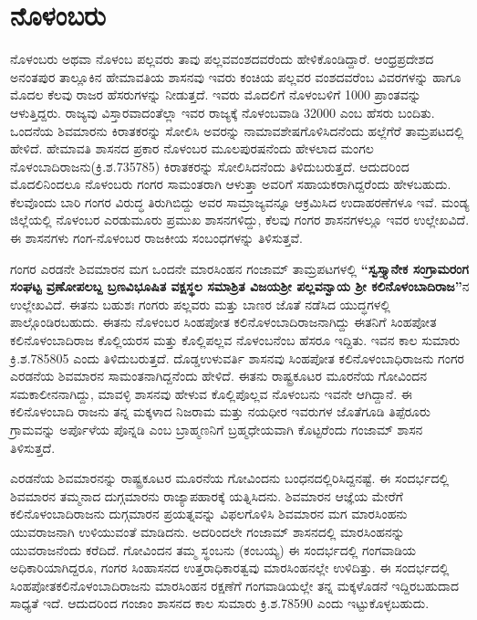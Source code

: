 \section*{ನೊಳಂಬರು}

ನೊಳಂಬರು ಅಥವಾ ನೊಳಂಬ ಪಲ್ಲವರು ತಾವು ಪಲ್ಲವವಂಶದವರೆಂದು ಹೇಳಿಕೊಂಡಿದ್ದಾರೆ. ಆಂಧ್ರಪ್ರದೇಶದ ಅನಂತಪುರ ತಾಲ್ಲೂಕಿನ ಹೇಮಾವತಿಯ ಶಾಸನವು ಇವರು ಕಂಚಿಯ ಪಲ್ಲವರ ವಂಶದವರೆಂಬ ವಿವರಗಳನ್ನು ಹಾಗೂ ಮೊದಲ ಕೆಲವು ರಾಜರ ಹೆಸರುಗಳನ್ನು ನೀಡುತ್ತದೆ. ಇವರು ಮೊದಲಿಗೆ ನೊಳಂಬಳಿಗೆ 1000 ಪ್ರಾಂತವನ್ನು ಆಳುತ್ತಿದ್ದರು. ರಾಜ್ಯವು ವಿಸ್ತಾರವಾದಂತೆಲ್ಲಾ ಇವರ ರಾಜ್ಯಕ್ಕೆ ನೊಳಂಬವಾಡಿ 32000 ಎಂಬ ಹೆಸರು ಬಂದಿತು. ಒಂದನೆಯ ಶಿವಮಾರನು ಕಿರಾತಕರನ್ನು ಸೋಲಿಸಿ ಅವರನ್ನು ನಾಮಾವಶೇಷಗೊಳಿಸಿದನೆಂದು ಹಲ್ಲೆಗೆರೆ ತಾಮ್ರಪಟದಲ್ಲಿ ಹೇಳಿದೆ. ಹೇಮಾವತಿ ಶಾಸನದ ಪ್ರಕಾರ ನೊಳಂಬರ ಮೂಲಪುರಷನೆಂದು ಹೇಳಲಾದ ಮಂಗಲ ನೊಳಂಬಾದಿರಾಜನು(ಕ್ರಿ.ಶ.735\enginline{-}785) ಕಿರಾತಕರನ್ನು ಸೋಲಿಸಿದನೆಂದು ತಿಳಿದುಬರುತ್ತದೆ. ಆದುದರಿಂದ ಮೊದಲಿನಿಂದಲೂ ನೊಳಂಬರು ಗಂಗರ ಸಾಮಂತರಾಗಿ ಆಳುತ್ತಾ ಅವರಿಗೆ ಸಹಾಯಕರಾಗಿದ್ದರೆಂದು ಹೇಳಬಹುದು. ಕೆಲವೊಂದು ಬಾರಿ ಗಂಗರ ವಿರುದ್ಧ ತಿರುಗಿಬಿದ್ದು ಅವರ ಸಾಮ್ರಾಜ್ಯವನ್ನೂ ಆಕ್ರಮಿಸಿದ ಉದಾಹರಣೆಗಳೂ ಇವೆ. ಮಂಡ್ಯ ಜಿಲ್ಲೆಯಲ್ಲಿ ನೊಳಂಬರ ಎರಡುಮೂರು ಪ್ರಮುಖ ಶಾಸನಗಳಿದ್ದು, ಕೆಲವು ಗಂಗರ ಶಾಸನಗಳಲ್ಲೂ ಇವರ ಉಲ್ಲೇಖವಿದೆ. ಈ ಶಾಸನಗಳು ಗಂಗ-ನೊಳಂಬರ ರಾಜಕೀಯ ಸಂಬಂಧಗಳನ್ನು ತಿಳಿಸುತ್ತವೆ.

ಗಂಗರ ಎರಡನೇ ಶಿವಮಾರನ ಮಗ ಒಂದನೇ ಮಾರಸಿಂಹನ ಗಂಜಾಮ್ ತಾಮ್ರಪಟಗಳಲ್ಲಿ \textbf{“ಸ್ವಸ್ತ್ಯಾನೇಕ ಸಂಗ್ರಾಮರಂಗ ಸಂಘಟ್ಟ ವ್ರಣೋಪಲಬ್ದ ಬ್ರಣವಿಭೂಷಿತ ವಕ್ಷಸ್ಥಲ ಸಮಾಶ್ರಿತ ವಿಜಯಶ‍್ರೀ ಪಲ್ಲವನ್ವಾಯ ಶ‍್ರೀ ಕಲಿನೊಳಂಬಾದಿರಾಜ”}ನ ಉಲ್ಲೇಖವಿದೆ. ಈತನು ಬಹುಶಃ ಗಂಗರು ಪಲ್ಲವರು ಮತ್ತು ಬಾಣರ ಜೊತೆ ನಡೆಸಿದ ಯುದ್ಧಗಳಲ್ಲಿ ಪಾಲ್ಗೊಂಡಿರಬಹುದು. ಈತನು ನೊಳಂಬರ ಸಿಂಹಪೋತ ಕಲಿನೊಳಂಬಾದಿರಾಜನಾಗಿದ್ದು ಈತನಿಗೆ ಸಿಂಹಪೋತ ಕಲಿನೊಳಂಬಾದಿರಾಜ ಕೊಲ್ಲಿಯರಸ ಮತ್ತು ಕೊಲ್ಲಿಪಲ್ಲವ ನೊಳಂಬನೆಂಬ ಹೆಸರೂ ಇದ್ದಿತು. ಇವನ ಕಾಲ ಸುಮಾರು ಕ್ರಿ.ಶ.785\enginline{-}805 ಎಂದು ತಿಳಿದುಬರುತ್ತದೆ. ದೊಡ್ಡಉಳುವರ್ತಿ ಶಾಸನವು ಸಿಂಹಪೋತ ಕಲಿನೊಳಂಬಾಧಿರಾಜನು ಗಂಗರ ಎರಡನೆಯ ಶಿವಮಾರನ ಸಾಮಂತನಾಗಿದ್ದನೆಂದು ಹೇಳಿದೆ. ಈತನು ರಾಷ್ಟ್ರಕೂಟರ ಮೂರನೆಯ ಗೋವಿಂದನ ಸಮಕಾಲೀನನಾಗಿದ್ದು, ಮಾವಳ್ಳಿ ಶಾಸನವು ಹೇಳುವ ಕೊಲ್ಲಿಪೊಲ್ಲವ ನೊಳಂಬನು ಇವನೇ ಆಗಿದ್ದಾನೆ. ಈ ಕಲಿನೊಳಂಬಾದಿ ರಾಜನು ತನ್ನ ಮಕ್ಕಳಾದ ನಿಜರಾಮ ಮತ್ತು ನಯಧೀರ ಇವರುಗಳ ಜೊತೆಗೂಡಿ ತಿಪ್ಪೆರೂರು ಗ್ರಾಮವನ್ನು ಅರ್ಪೊಳೆಯ ಪೊನ್ನಡಿ ಎಂಬ ಬ್ರಾಹ್ಮಣನಿಗೆ ಬ್ರಹ್ಮಧೇಯವಾಗಿ ಕೊಟ್ಟರೆಂದು ಗಂಜಾಮ್ ಶಾಸನ ತಿಳಿಸುತ್ತದೆ.

ಎರಡನೆಯ ಶಿವಮಾರನನ್ನು ರಾಷ್ಟ್ರಕೂಟರ ಮೂರನೆಯ ಗೋವಿಂದನು ಬಂಧನದಲ್ಲಿರಿಸಿದ್ದನಷ್ಟೆ. ಈ ಸಂದರ್ಭದಲ್ಲಿ ಶಿವಮಾರನ ತಮ್ಮನಾದ ದುಗ್ಗಮಾರನು ರಾಜ್ಯಾಪಹಾರಕ್ಕೆ ಯತ್ನಿಸಿದನು. ಶಿವಮಾರನ ಆಜ್ಞೆಯ ಮೇರೆಗೆ ಕಲಿನೊಳಂಬಾದಿ\-ರಾಜನು ದುಗ್ಗಮಾರನ ಪ್ರಯತ್ನವನ್ನು ವಿಫಲಗೊಳಿಸಿ ಶಿವಮಾರನ ಮಗ ಮಾರಸಿಂಹನು ಯುವರಾಜನಾಗಿ ಉಳಿಯುವಂತೆ ಮಾಡಿದನು. ಅದರಿಂದಲೇ ಗಂಜಾಮ್ ಶಾಸನದಲ್ಲಿ ಮಾರಸಿಂಹನನ್ನು ಯುವರಾಜನೆಂದು ಕರೆದಿದೆ. ಗೋವಿಂದನ ತಮ್ಮ ಸ್ಥಂಬನು (ಕಂಬಯ್ಯ) ಈ ಸಂದರ್ಭದಲ್ಲಿ ಗಂಗವಾಡಿಯ ಅಧಿಕಾರಿಯಾಗಿದ್ದರೂ, ಗಂಗರ ಸಿಂಹಾಸನದ ಉತ್ತರಾಧಿಕಾರತ್ವವು ಮಾರಸಿಂಹನಲ್ಲೇ ಉಳಿದಿತ್ತು. ಈ ಸಂದರ್ಭದಲ್ಲಿ ಸಿಂಹಪೋತಕಲಿನೊಳಂಬಾದಿರಾಜನು ಮಾರಸಿಂಹನ ರಕ್ಷಣೆಗೆ ಗಂಗವಾಡಿ\-ಯಲ್ಲೇ ತನ್ನ ಮಕ್ಕಳೊಡನೆ ಇದ್ದಿರಬಹುದಾದ ಸಾಧ್ಯತೆ ಇದೆ. ಆದುದರಿಂದ ಗಂಜಾಂ ಶಾಸನದ ಕಾಲ ಸುಮಾರು ಕ್ರಿ.ಶ.785\enginline{-}90 ಎಂದು ಇಟ್ಟುಕೊಳ್ಳಬಹುದು.

